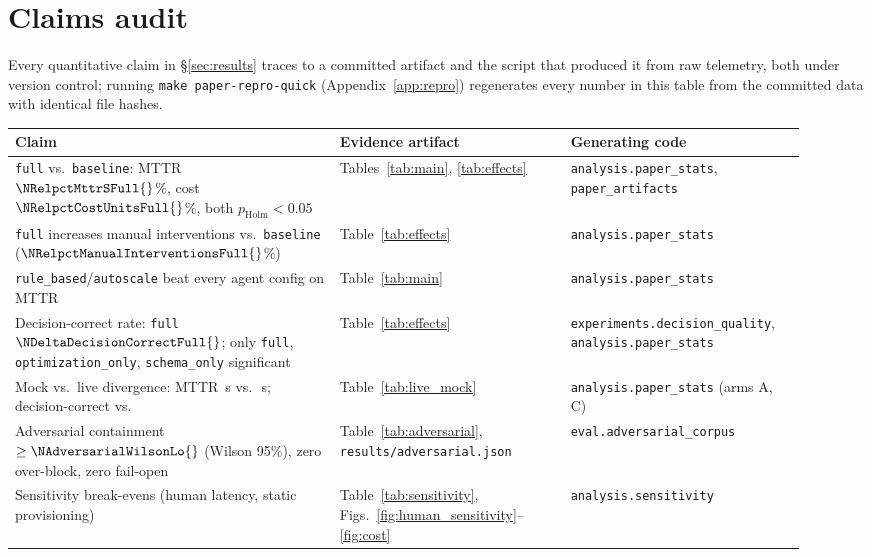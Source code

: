 \section{Claims audit}\label{app:claims}

Every quantitative claim in \S\ref{sec:results} traces to a committed artifact and the script that
produced it from raw telemetry, both under version control; running \texttt{make paper-repro-quick}
(Appendix~\ref{app:repro}) regenerates every number in this table from the committed data with
identical file hashes.

\begin{center}
\begin{tabular}{@{}p{0.38\linewidth}p{0.27\linewidth}p{0.27\linewidth}@{}}
\toprule
Claim & Evidence artifact & Generating code \\
\midrule
\texttt{full} vs.\ \texttt{baseline}: MTTR $\NRelpctMttrSFull{}$\%, cost $\NRelpctCostUnitsFull{}$\%,
  both $p_{\mathrm{Holm}}<0.05$ &
  Tables~\ref{tab:main}, \ref{tab:effects} &
  \texttt{analysis.paper\_stats}, \texttt{paper\_artifacts} \\
\texttt{full} increases manual interventions vs.\ \texttt{baseline} ($\NRelpctManualInterventionsFull{}$\%) &
  Table~\ref{tab:effects} &
  \texttt{analysis.paper\_stats} \\
\texttt{rule\_based}/\texttt{autoscale} beat every agent config on MTTR &
  Table~\ref{tab:main} &
  \texttt{analysis.paper\_stats} \\
Decision-correct rate: \texttt{full} $\NDeltaDecisionCorrectFull{}$; only \texttt{full},
  \texttt{optimization\_only}, \texttt{schema\_only} significant &
  Table~\ref{tab:effects} &
  \texttt{experiments.\allowbreak decision\_quality}, \texttt{analysis.paper\_stats} \\
Mock vs.\ live divergence: MTTR \NLiveVsMockMttrSLive{}\,s vs.\ \NLiveVsMockMttrSMock{}\,s;
  decision-correct \NLiveVsMockDecisionCorrectLive{} vs.\ \NLiveVsMockDecisionCorrectMock{} &
  Table~\ref{tab:live_mock} &
  \texttt{analysis.paper\_stats} (arms A, C) \\
Adversarial containment $\geq\NAdversarialWilsonLo{}$ (Wilson 95\%), zero over-block, zero fail-open &
  Table~\ref{tab:adversarial}, \texttt{results/\allowbreak adversarial.json} &
  \texttt{eval.adversarial\_corpus} \\
Sensitivity break-evens (human latency, static provisioning) &
  Table~\ref{tab:sensitivity}, Figs.~\ref{fig:human_sensitivity}--\ref{fig:cost} &
  \texttt{analysis.sensitivity} \\

\end{tabular}
\end{center}
